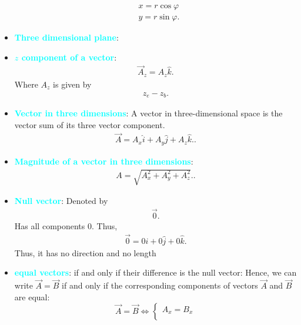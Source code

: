 \documentclass{report}
\begin{document}
\begin{itemize}
            \begin{align*}
                &x = r\cos{\varphi} \\
                &y = r\sin{\varphi}
            .\end{align*}
        \item \textbf{\textcolor{cyan}{Three dimensional plane}}:
            \bigbreak \noindent 
        \item \textbf{\textcolor{cyan}{$z$ component of a vector}}:
            \begin{align*}
                \vec{A}_{z} = A_{z}\hat{k} 
            .\end{align*}
            Where $A_{z}$ is given by 
            \begin{align*}
                z_{e} - z_{b}
            .\end{align*}
        \item \textbf{\textcolor{cyan}{Vector in three dimensions}}: A vector in three-dimensional space is the vector sum of its three vector component. 
            \begin{align*}
                \vec{A} = A_x \hat{i} + A_y \hat{j} + A_z \hat{k}.
            .\end{align*}
        \item \textbf{\textcolor{cyan}{Magnitude of a vector in three dimensions}}:
            \begin{align*}
                A = \sqrt{A_x^2 + A_y^2 + A_z^2}.
            .\end{align*}
        \item \textbf{\textcolor{cyan}{Null vector}}: Denoted by 
            \begin{align*}
                \vec{0}
            .\end{align*}
            Has all components 0. Thus, 
            \begin{align*}
                \vec{0} = 0\hat{i} + 0\hat{j} + 0\hat{k}
            .\end{align*}
            Thus, it has no direction and no length
        \item \textbf{\textcolor{cyan}{equal vectors}}: if and only if their difference is the null vector:
        Hence, we can write $\vec{A} = \vec{B}$ if and only if the corresponding components of vectors $\vec{A}$ and $\vec{B}$ are equal:
        \[
        \vec{A} = \vec{B} \Leftrightarrow
        \left\{
            \begin{array}{l}
                A_x = B_x \\

\end{array}\]
\end{itemize}
\end{document}
